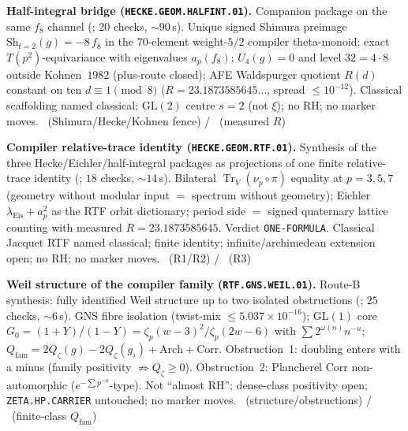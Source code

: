 \par\smallskip\noindent\textbf{Half-integral bridge
(\texttt{HECKE.GEOM.HALFINT.01}).}
Companion package on the same $f_8$ channel
(; $20$ checks, $\sim90$\,s). Unique signed Shimura
preimage $\mathrm{Sh}_{t=2}(g)=-8\,f_8$ in the $70$-element weight-$5/2$ compiler
theta-monoid; exact $T(p^2)$-equivariance with eigenvalues $a_p(f_8)$; $U_4(g)=0$ and
level $32=4\cdot8$ outside Kohnen~$1982$ (plus-route closed); AFE Waldspurger quotient
$R(d)$ constant on ten $d\equiv1\pmod8$ ($R=23.1873585645\ldots$, spread $\le10^{-12}$).
Classical scaffolding named classical; GL$(2)$ centre $s=2$ (not $\xi$); no RH; no marker
moves.
\mE\ (Shimura/Hecke/Kohnen fence) / \mC\ (measured $R$)


\par\smallskip\noindent\textbf{Compiler relative-trace identity
(\texttt{HECKE.GEOM.RTF.01}).}
Synthesis of the three Hecke/Eichler/half-integral packages as projections of one finite
relative-trace identity
(; $18$ checks, $\sim14$\,s). Bilateral
$\operatorname{Tr}_V(\nu_p\circ\pi)$ equality at $p=3,5,7$ (geometry without modular input
$=$ spectrum without geometry); Eichler $\lambda_{\mathrm{Eis}}+a_p^2$ as the RTF orbit
dictionary; period side $=$ signed quaternary lattice counting with measured
$R=23.1873585645$. Verdict \texttt{ONE-FORMULA}. Classical Jacquet RTF named classical;
finite identity; infinite/archimedean extension open; no RH; no marker moves.
\mE\ (R1/R2) / \mC\ (R3)


\par\smallskip\noindent\textbf{Weil structure of the compiler family
(\texttt{RTF.GNS.WEIL.01}).}
Route-B synthesis: fully identified Weil structure up to two isolated obstructions
(; $25$ checks, $\sim6$\,s).
GNS fibre isolation (twist-mix $\le5.037\times10^{-16}$);
GL$(1)$ core $G_0=(1+Y)/(1-Y)=\zeta_p(w-3)^2/\zeta_p(2w-6)$ with
$\sum 2^{\omega(n)}n^{-u}$;
$Q_{\mathrm{fam}}=2Q_\zeta(g)-2Q_\zeta(g_\flat)+\mathrm{Arch}+\mathrm{Corr}$.
Obstruction~1: doubling enters with a minus (family positivity $\not\Rightarrow Q_\zeta\ge0$).
Obstruction~2: Plancherel Corr non-automorphic ($e^{-\sum p^{-u}}$-type).
Not ``almost RH''; dense-class positivity open; \texttt{ZETA.HP.CARRIER} untouched;
no marker moves.
\mE\ (structure/obstructions) / \mC\ (finite-class $Q_{\mathrm{fam}}$)



